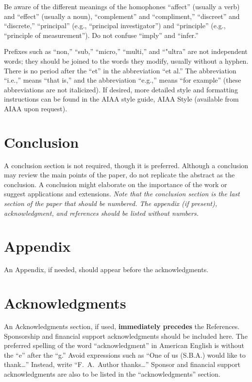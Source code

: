 \documentclass[conf]{new-aiaa}
\begin{document}
Be aware of the different meanings of the homophones ``affect'' (usually a verb) and ``effect'' (usually a noun), ``complement'' and ``compliment,'' ``discreet'' and ``discrete,'' ``principal'' (e.g., ``principal investigator'') and ``principle'' (e.g., ``principle of measurement''). Do not confuse ``imply'' and ``infer.''

Prefixes such as ``non,'' ``sub,'' ``micro,'' ``multi,'' and ``"ultra'' are not independent words; they should be joined to the words they modify, usually without a hyphen. There is no period after the ``et'' in the abbreviation ``et al.'' The abbreviation ``i.e.,'' means ``that is,'' and the abbreviation ``e.g.,'' means ``for example'' (these abbreviations are not italicized). If desired, more detailed style and formatting instructions can be found in the AIAA style guide, AIAA Style (available from AIAA upon request).


\section{Conclusion}
A conclusion section is not required, though it is preferred. Although a conclusion may review the main points of the paper, do not replicate the abstract as the conclusion. A conclusion might elaborate on the importance of the work or suggest applications and extensions. \textit{Note that the conclusion section is the last section of the paper that should be numbered. The appendix (if present), acknowledgment, and references should be listed without numbers.}


\section*{Appendix}

An Appendix, if needed, should appear before the acknowledgments.

\section*{Acknowledgments}
An Acknowledgments section, if used, \textbf{immediately precedes} the References. Sponsorship and financial support acknowledgments should be included here. The preferred spelling of the word ``acknowledgment'' in American English is without the ``e'' after the ``g.'' Avoid expressions such as ``One of us (S.B.A.) would like to thank\ldots'' Instead, write ``F.~A.~Author thanks\ldots'' Sponsor and financial support acknowledgments are also to be listed in the ``acknowledgments'' section.


\end{document}
